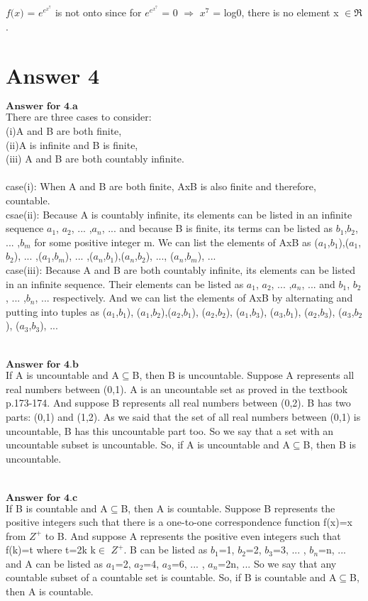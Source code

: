 \documentclass[12pt]{article}
\begin{document}
$\textit{f(x)}$ = $e^{e^{x^{7}}}$ is not onto since for $e^{e^{x^{7}}}$ = 0 $\Rightarrow$ $x^{7}$ = log0, there is no element x $\in\Re$. \\


\section*{Answer 4}
$\textbf{Answer for 4.a}$ \\
There are three cases to consider: \\
(i)A and B are both finite, \\
(ii)A is infinite and B is finite,\\
(iii) A and B are both countably infinite.\\
\\
case(i): When A and B are both finite, AxB is also finite and therefore, countable. \\
csae(ii): Because A is countably infinite, its 	elements can be listed in an infinite sequence $a_{1}$, $a_{2}$, ... ,$a_{n}$, ... and because B is finite, its terms can be listed as 	$b_{1}$,$b_{2}$, ... ,$b_{m}$ for some positive integer m. We can list the elements of AxB as ($a_{1}$,$b_{1}$),($a_{1}$,$b_{2}$), ... ,($a_{1}$,$b_{m}$), ... ,($a_{n}$,$b_{1}$),($a_{n}$,$b_{2}$), ..., ($a_{n}$,$b_{m}$), ... \\
case(iii): Because A and B are both countably infinite, its elements can be listed in an infinite sequence. Their elements can be listed as $a_{1}$, $a_{2}$, ... ,$a_{n}$, ... and $b_{1}$, $b_{2}$, ... ,$b_{n}$, ... respectively. And we can list the elements of AxB by alternating and putting into tuples as ($a_{1}$,$b_{1}$), ($a_{1}$,$b_{2}$),($a_{2}$,$b_{1}$), ($a_{2}$,$b_{2}$), ($a_{1}$,$b_{3}$), ($a_{3}$,$b_{1}$), ($a_{2}$,$b_{3}$), ($a_{3}$,$b_{2}$), ($a_{3}$,$b_{3}$), ... \\
\\
\\
$\textbf{Answer for 4.b}$ \\
If A is uncountable and A$\subseteq$B, then B is uncountable. Suppose A represents all real numbers between (0,1). A is an uncountable set as proved in the textbook p.173-174. And suppose B represents all real numbers between (0,2). B has two parts: (0,1) and (1,2). As we said that the set of all real numbers between (0,1) is uncountable, B has this uncountable part too. So we say that a set with an uncountable subset is uncountable. So, if A is uncountable and A$\subseteq$B, then B is uncountable.
\\
\\
\\
$\textbf{Answer for 4.c}$ \\
If B is countable and A$\subseteq$B, then A is countable. Suppose B represents the positive integers such that there is a one-to-one correspondence function f(x)=x from $Z^{+}$ to B. And suppose A represents the positive even integers such that f(k)=t where t=2k k$\in$ $Z^{+}$. B can be listed as $b_{1}$=1, $b_{2}$=2, $b_{3}$=3, ... , $b_n$=n, ... and A can be listed as $a_{1}$=2, $a_{2}$=4, $a_{3}$=6, ... , $a_n$=2n, ... So we say that any countable subset of a countable set is countable. So, if B is countable and A$\subseteq$B, then A is countable.
\end{document}
